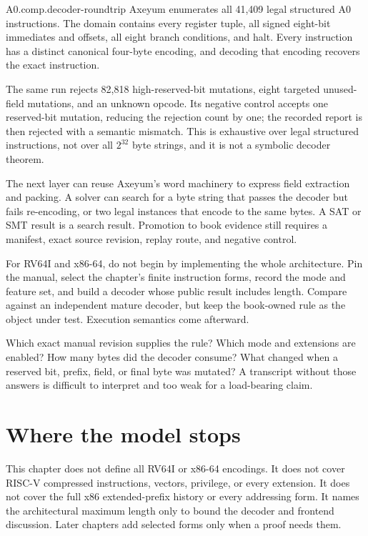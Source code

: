 \begin{artifact}{A0.comp.decoder-roundtrip}
Axeyum enumerates all 41,409 legal structured A0 instructions. The domain
contains every register tuple, all signed eight-bit immediates and offsets,
all eight branch conditions, and halt. Every instruction has a distinct
canonical four-byte encoding, and decoding that encoding recovers the exact
instruction.

The same run rejects 82,818 high-reserved-bit mutations, eight targeted
unused-field mutations, and an unknown opcode. Its negative control accepts
one reserved-bit mutation, reducing the rejection count by one; the recorded
report is then rejected with a semantic mismatch. This is exhaustive over
legal structured instructions, not over all \(2^{32}\) byte strings, and it is
not a symbolic decoder theorem.
\end{artifact}

The next layer can reuse Axeyum's word machinery to express field extraction
and packing. A solver can search for a byte string that passes the decoder but
fails re-encoding, or two legal instances that encode to the same bytes. A SAT
or SMT result is a search result. Promotion to book evidence still requires a
manifest, exact source revision, replay route, and negative control.

For RV64I and x86-64, do not begin by implementing the whole architecture.
Pin the manual, select the chapter's finite instruction forms, record the
mode and feature set, and build a decoder whose public result includes length.
Compare against an independent mature decoder, but keep the book-owned rule as
the object under test. Execution semantics come afterward.

\begin{sidebar}[title={Four questions to ask of every decoder run}]
Which exact manual revision supplies the rule? Which mode and extensions are
enabled? How many bytes did the decoder consume? What changed when a reserved
bit, prefix, field, or final byte was mutated? A transcript without those
answers is difficult to interpret and too weak for a load-bearing claim.
\end{sidebar}

\section{Where the model stops}

This chapter does not define all RV64I or x86-64 encodings. It does not cover
RISC-V compressed instructions, vectors, privilege, or every extension. It
does not cover the full x86 extended-prefix history or every
addressing form. It names the architectural maximum length only to bound the
decoder and frontend discussion. Later chapters add selected forms
only when a proof needs them.

